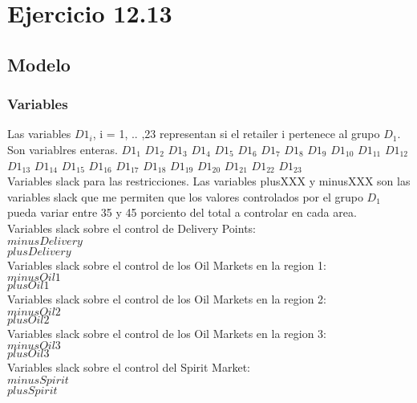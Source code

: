 \section{Ejercicio 12.13}
\subsection{Modelo}
\subsubsection{Variables}
Las variables ${D1}_i$, i = 1, .. ,23 representan si el retailer i pertenece al grupo ${D}_1$. Son variablres enteras.
${D1}_1$
${D1}_2$
${D1}_3$
${D1}_4$
${D1}_5$
${D1}_6$
${D1}_7$
${D1}_8$
${D1}_9$
${D1}_{10}$
${D1}_{11}$
${D1}_{12}$
${D1}_{13}$
${D1}_{14}$
${D1}_{15}$
${D1}_{16}$
${D1}_{17}$
${D1}_{18}$
${D1}_{19}$
${D1}_{20}$
${D1}_{21}$
${D1}_{22}$
${D1}_{23}$  \\

Variables slack para las restricciones. Las variables plusXXX y minusXXX son las variables slack que me permiten que los valores
controlados por el grupo $D_1$ pueda variar entre 35 y 45 porciento del total a controlar en cada area. \\
Variables slack sobre el control de Delivery Points: \\
$minusDelivery$ \\
$plusDelivery$ \\
Variables slack sobre el control de los Oil Markets en la region 1: \\
$minusOil1$ \\
$plusOil1$ \\
Variables slack sobre el control de los Oil Markets en la region 2: \\
$minusOil2$ \\
$plusOil2$ \\
Variables slack sobre el control de los Oil Markets en la region 3: \\
$minusOil3$ \\
$plusOil3$ \\
Variables slack sobre el control del Spirit Market: \\
$minusSpirit$ \\
$plusSpirit$ \\
